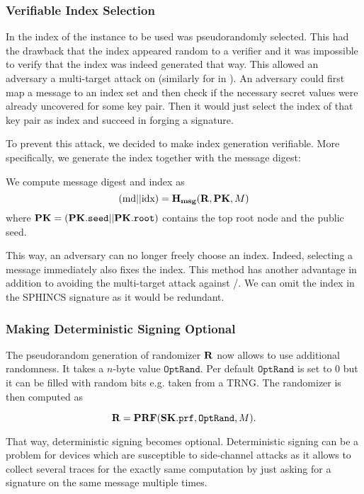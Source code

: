 \subsubsection{Verifiable Index Selection} 
In \spc the index of the \horst instance to be used was pseudorandomly selected.
This had the drawback that the index appeared random to a verifier and it was 
impossible to verify that the index was indeed generated that way. This allowed 
an adversary a multi-target attack on \horst (similarly for \fors in \spx). An 
adversary could first map a message to an index set and then check if the 
necessary secret values were already uncovered for some \horst key pair. Then it 
would just select the index of that \horst key pair as index and succeed in 
forging a signature. 

To prevent this attack, we decided to make index generation verifiable. More 
specifically, we generate the index together with the message digest:

 We compute message digest and index as
        $$( \textrm{md} || \textrm{idx} ) = \mathbf{H_{msg}} ( \mathbf{R}, \mathbf{PK}, M )$$
 where $\mathbf{PK} = ( \mathbf{PK}.\texttt{seed} || \mathbf{PK}.\texttt{root} )$ contains the top root node and the public seed.
 
 This way, an adversary can no longer freely choose an index. Indeed, selecting 
 a message immediately also fixes the index. This method has another advantage 
 in addition to avoiding the multi-target 
 attack against \fors /\horst. We can omit the index in the SPHINCS 
 signature as it would be redundant. 
 
 \subsubsection{Making Deterministic Signing Optional}
 \label{subsec:optrand}
 The pseudorandom generation of randomizer $\mathbf{R}$ now allows to use additional 
 randomness. It takes a $n$-byte value $\texttt{OptRand}$. Per default 
 $\texttt{OptRand}$ is set to 0 but it can be filled 
 with random bits e.g. taken from a TRNG. The randomizer is then computed as 
        
        $$\mathbf{R} = \mathbf{PRF} (\mathbf{SK}.\texttt{prf}, \texttt{OptRand}, M).$$
        
 That way, deterministic signing becomes optional. Deterministic signing can be 
 a problem for devices which are susceptible to side-channel attacks 
 as it allows to collect several traces
 for the exactly same computation by just asking for a signature on the same 
 message multiple times. 
 
